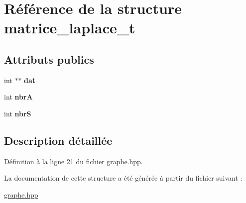 \hypertarget{structmatrice__laplace__t}{\section{Référence de la structure matrice\+\_\+laplace\+\_\+t}
\label{structmatrice__laplace__t}
}
\subsection*{Attributs publics}
\begin{DoxyCompactItemize}
\item 
\hypertarget{structmatrice__laplace__t_a3f58ff72f8d8e5b8f154e369916d7d08}{int $\ast$$\ast$ {\bfseries dat}}\label{structmatrice__laplace__t_a3f58ff72f8d8e5b8f154e369916d7d08}

\item 
\hypertarget{structmatrice__laplace__t_aa88d77ffa32b29613bf571afe3ea03e0}{int {\bfseries nbr\+A}}\label{structmatrice__laplace__t_aa88d77ffa32b29613bf571afe3ea03e0}

\item 
\hypertarget{structmatrice__laplace__t_a93d1312a981c2f318811735736d3d85c}{int {\bfseries nbr\+S}}\label{structmatrice__laplace__t_a93d1312a981c2f318811735736d3d85c}

\end{DoxyCompactItemize}


\subsection{Description détaillée}


Définition à la ligne 21 du fichier graphe.\+hpp.



La documentation de cette structure a été générée à partir du fichier suivant \+:\begin{DoxyCompactItemize}
\item 
\hyperlink{graphe_8hpp}{graphe.\+hpp}\end{DoxyCompactItemize}
